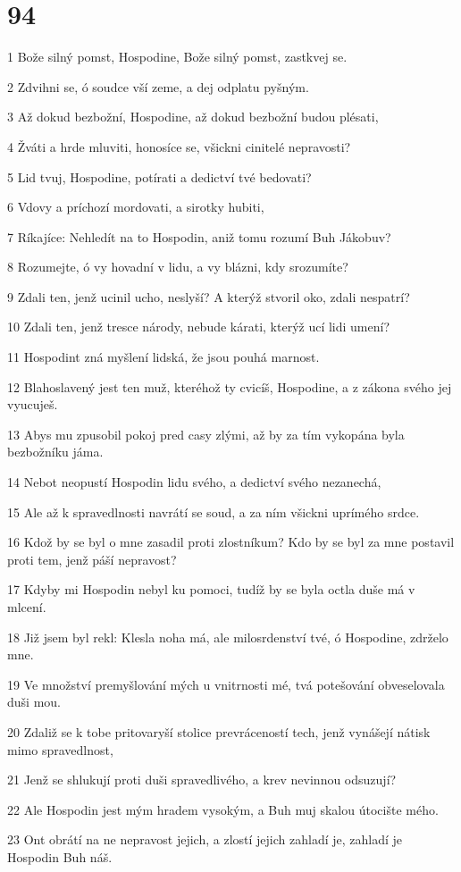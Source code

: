 \chapter{94}

\par 1 Bože silný pomst, Hospodine, Bože silný pomst, zastkvej se.
\par 2 Zdvihni se, ó soudce vší zeme, a dej odplatu pyšným.
\par 3 Až dokud bezbožní, Hospodine, až dokud bezbožní budou plésati,
\par 4 Žváti a hrde mluviti, honosíce se, všickni cinitelé nepravosti?
\par 5 Lid tvuj, Hospodine, potírati a dedictví tvé bedovati?
\par 6 Vdovy a príchozí mordovati, a sirotky hubiti,
\par 7 Ríkajíce: Nehledít na to Hospodin, aniž tomu rozumí Buh Jákobuv?
\par 8 Rozumejte, ó vy hovadní v lidu, a vy blázni, kdy srozumíte?
\par 9 Zdali ten, jenž ucinil ucho, neslyší? A kterýž stvoril oko, zdali nespatrí?
\par 10 Zdali ten, jenž tresce národy, nebude kárati, kterýž ucí lidi umení?
\par 11 Hospodint zná myšlení lidská, že jsou pouhá marnost.
\par 12 Blahoslavený jest ten muž, kteréhož ty cvicíš, Hospodine, a z zákona svého jej vyucuješ.
\par 13 Abys mu zpusobil pokoj pred casy zlými, až by za tím vykopána byla bezbožníku jáma.
\par 14 Nebot neopustí Hospodin lidu svého, a dedictví svého nezanechá,
\par 15 Ale až k spravedlnosti navrátí se soud, a za ním všickni uprímého srdce.
\par 16 Kdož by se byl o mne zasadil proti zlostníkum? Kdo by se byl za mne postavil proti tem, jenž páší nepravost?
\par 17 Kdyby mi Hospodin nebyl ku pomoci, tudíž by se byla octla duše má v mlcení.
\par 18 Již jsem byl rekl: Klesla noha má, ale milosrdenství tvé, ó Hospodine, zdrželo mne.
\par 19 Ve množství premyšlování mých u vnitrnosti mé, tvá potešování obveselovala duši mou.
\par 20 Zdaliž se k tobe pritovaryší stolice prevráceností tech, jenž vynášejí nátisk mimo spravedlnost,
\par 21 Jenž se shlukují proti duši spravedlivého, a krev nevinnou odsuzují?
\par 22 Ale Hospodin jest mým hradem vysokým, a Buh muj skalou útocište mého.
\par 23 Ont obrátí na ne nepravost jejich, a zlostí jejich zahladí je, zahladí je Hospodin Buh náš.

